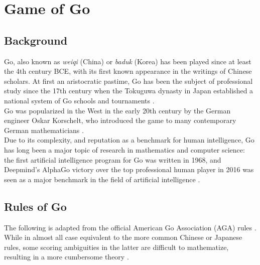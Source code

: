 \documentclass[../math194_paper.tex]{subfiles}
\begin{document}
\section{Game of Go}

\subsection{Background}
Go, also known as \textit{weiqi} (China) or \textit{baduk} (Korea) has been played 
since at least the 4th century BCE, with its first known appearance in the writings 
of Chinese scholars. At first an aristocratic pastime, Go has been the subject of 
professional study since the 17th century when the Tokuguwa dynasty in Japan established 
a national system of Go schools and tournaments \cite{agahistory}.\\

Go was popularized in the West in the early 20th century by the German engineer Oskar 
Korschelt, who introduced the game to many contemporary German mathematicians \cite{korschelt2012theory}.\\

Due to its complexity, and reputation as a benchmark for human intelligence,
Go has long been a major topic of research in mathematics and computer science: the first
artificial intelligence program for Go was written in 1968, and Deepmind's AlphaGo victory 
over the top professional human player in 2016 was seen as a major benchmark in the field 
of artificial intelligence \cite{silver2017mastering}.
    
\subsection{Rules of Go}

The following is adapted from the official American Go Association (AGA) rules
\cite{agarules}. While in almost all case equivalent to the more common Chinese 
or Japanese rules, some scoring ambiguities in the latter are difficult to mathematize,
resulting in a more cumbersome theory \cite[Appendix. 1]{berlekamp1994mathematical}. 
\end{document}
